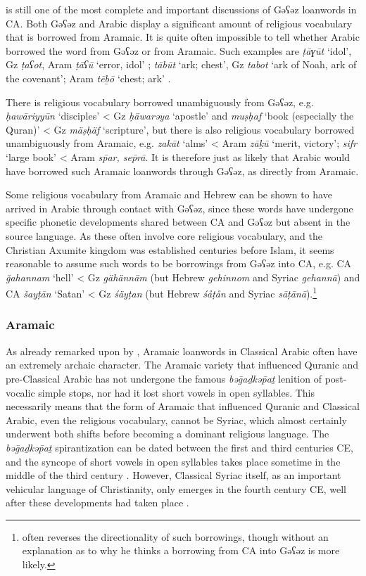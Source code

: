 \documentclass[output=paper]{langsci/langscibook}
\begin{document}
\citet{Nöldeke1910} is still one of the most complete and important discussions of Gəʕəz loanwords in CA. Both Gəʕəz and Arabic display a significant amount of religious vocabulary that is borrowed from Aramaic. It is quite often impossible to tell whether Arabic borrowed the word from Gəʕəz or from Aramaic. Such examples are \textit{ṭāɣūt} ‘idol’, Gz \textit{ṭaʕot}, Aram \textit{ṭāʕū} ‘error, idol’ \citep[48]{Nöldeke1910}; \textit{tābūt} ‘ark; chest’, Gz \textit{tabot} ‘ark of Noah, ark of the covenant’; Aram \textit{tēḇō} ‘chest; ark’ \citep[49]{Nöldeke1910}.

There is religious vocabulary borrowed unambiguously from Gəʕəz, e.g. \textit{ḥawāriyyūn} ‘disciples’ < Gz \textit{ḥäwarəya} ‘apostle’ and \textit{muṣḥaf} ‘book (especially the Quran)’ < Gz \textit{mäṣḥäf} ‘scripture’, but there is also religious vocabulary borrowed unambiguously from Aramaic, e.g. \textit{zakāt} ‘alms’ < Aram \textit{zāḵū} ‘merit, victory’; \textit{sifr} ‘large book’ < Aram \textit{s\={p}ar, se\={p}rā}. It is therefore just as likely that Arabic would have borrowed such Aramaic loanwords through Gəʕəz, as directly from Aramaic.

Some religious vocabulary from Aramaic and Hebrew can be shown to have arrived in Arabic through contact with Gəʕəz, since these words have undergone specific phonetic developments shared between CA and Gəʕəz but absent in the source language. As these often involve core religious vocabulary, and the Christian Axumite kingdom was established centuries before Islam, it seems reasonable to assume such words to be borrowings from Gəʕəz into CA, e.g. CA \textit{ǧahannam} ‘hell’ < Gz \textit{gähännäm} (but Hebrew \textit{gehinnom} and Syriac \textit{gehannā}) and CA \textit{šayṭān} ‘Satan’ < Gz \textit{śäyṭan} (but Hebrew \textit{śåṭån} and Syriac \textit{sāṭānā}).\footnote{\citet{Leslau1990} often reverses the directionality of such borrowings, though without an explanation as to why he thinks a borrowing from CA into Gəʕəz is more likely.}

\subsubsection{\label{bkm:Ref13224460}Aramaic}

As already remarked upon by \citet{Retsö2011}, Aramaic loanwords in Classical Arabic often have an extremely archaic character. The Aramaic variety that influenced Quranic and pre-Classical Arabic has not undergone the famous \textit{bəḡaḏkə\={p}aṯ} lenition of post-vocalic simple stops, nor had it lost short vowels in open syllables. This necessarily means that the form of Aramaic that influenced Quranic and Classical Arabic, even the religious vocabulary, cannot be Syriac, which almost certainly underwent both shifts before becoming a dominant religious language. The \textit{bəḡaḏkə\={p}aṯ} spirantization can be dated between the first and third centuries CE, and the syncope of short vowels in open syllables takes place sometime in the middle of the third century \citep[41--42]{Gzella2015}. However, Classical Syriac itself, as an important vehicular language of Christianity, only emerges in the fourth century CE, well after these developments had taken place \citep[259]{Gzella2015}.
\end{document}
